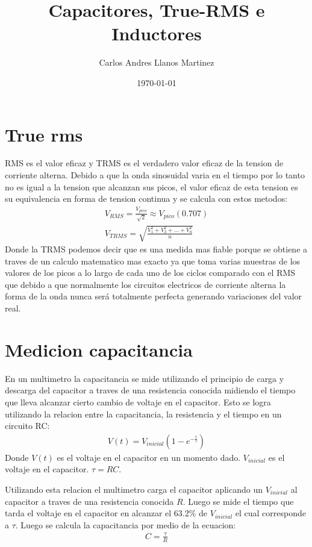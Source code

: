 \documentclass{article}
\title{Capacitores, True-RMS e Inductores}
\author{Carlos Andres Llanos Martinez}
\date{\today}
\begin{document}
\maketitle

\section{True rms}
RMS es el valor eficaz y TRMS es el verdadero valor eficaz de la tension de corriente alterna. Debido a que la onda sinosuidal varia en el tiempo  por lo tanto no es igual a la tension que alcanzan sus picos, el valor eficaz de esta tension es su equivalencia en forma de tension continua y se calcula con estos metodos: 
\begin{gather*}
  V _{RMS } = \frac{V _{pico } }{\sqrt{2 } } \approx V _{pico } (0.707) \\
  V _{TRMS }  = \sqrt{\frac{V_1 ^2 + V_2 ^2 + ... + V_n ^2 }{n}} 
\end{gather*}
Donde la TRMS podemos decir que es una medida mas fiable porque se obtiene a traves de un calculo matematico mas exacto  ya que toma varias muestras de los valores de los picos a lo largo de cada uno de los ciclos comparado con el RMS que debido a que normalmente los circuitos electricos de corriente alterna la forma de la onda nunca será totalmente perfecta generando variaciones del valor real. 

\section{Medicion capacitancia }
En un multimetro la capacitancia se mide utilizando el principio de carga y descarga del capacitor a traves de una resistencia conocida midiendo el tiempo que lleva alcanzar cierto cambio de voltaje en el capacitor. Esto se logra utilizando la relacion entre la capacitancia, la resistencia y el tiempo en un circuito RC: 
\begin{gather*}
  V(t) = V _{inicial } \left(1- e ^ {-\frac{t}{\tau}}\right) 
\end{gather*}
Donde $ V(t)  $ es el voltaje en el capacitor en un momento dado. $ V _{inicial }  $ es el voltaje en el capacitor. $ \tau  = RC $.

Utilizando esta relacion el multimetro carga el capacitor aplicando un $ V _{inicial }  $ al capacitor a traves de una resistencia conocida $ R  $. Luego se mide el tiempo que tarda el voltaje en el capacitor en alcanzar el 63.2\% de $ V _{inicial }  $ el cual corresponde a $ \tau  $. Luego se calcula la capacitancia por medio de la ecuacion:
\begin{gather*}
  C = \frac{\tau }{R} 
\end{gather*}
\end{document}
